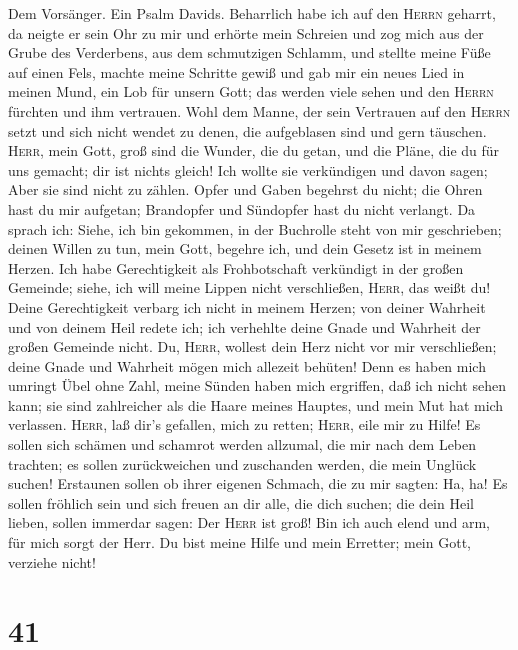  Dem Vorsänger. Ein Psalm Davids. Beharrlich habe ich auf
den \textsc{Herrn} geharrt, da neigte er sein Ohr zu mir und erhörte
mein Schreien  und zog mich aus der Grube des Verderbens,
aus dem schmutzigen Schlamm, und stellte meine Füße auf einen Fels,
machte meine Schritte gewiß  und gab mir ein neues Lied in
meinen Mund, ein Lob für unsern Gott; das werden viele sehen und den
\textsc{Herrn} fürchten und ihm vertrauen.  Wohl dem
Manne, der sein Vertrauen auf den \textsc{Herrn} setzt und sich nicht
wendet zu denen, die aufgeblasen sind und gern täuschen. 
\textsc{Herr}, mein Gott, groß sind die Wunder, die du getan, und die
Pläne, die du für uns gemacht; dir ist nichts gleich! Ich wollte sie
verkündigen und davon sagen; Aber sie sind nicht zu zählen.
 Opfer und Gaben begehrst du nicht; die Ohren hast du mir
aufgetan; Brandopfer und Sündopfer hast du nicht verlangt.
 Da sprach ich: Siehe, ich bin gekommen, in der Buchrolle
steht von mir geschrieben;  deinen Willen zu tun, mein
Gott, begehre ich, und dein Gesetz ist in meinem Herzen. 
Ich habe Gerechtigkeit als Frohbotschaft verkündigt in der großen
Gemeinde; siehe, ich will meine Lippen nicht verschließen,
\textsc{Herr}, das weißt du!  Deine Gerechtigkeit verbarg
ich nicht in meinem Herzen; von deiner Wahrheit und von deinem Heil
redete ich; ich verhehlte deine Gnade und Wahrheit der großen Gemeinde
nicht.  Du, \textsc{Herr}, wollest dein Herz nicht vor
mir verschließen; deine Gnade und Wahrheit mögen mich allezeit behüten!
 Denn es haben mich umringt Übel ohne Zahl, meine Sünden
haben mich ergriffen, daß ich nicht sehen kann; sie sind zahlreicher als
die Haare meines Hauptes, und mein Mut hat mich verlassen.
 \textsc{Herr}, laß dir's gefallen, mich zu retten;
\textsc{Herr}, eile mir zu Hilfe!  Es sollen sich schämen
und schamrot werden allzumal, die mir nach dem Leben trachten; es sollen
zurückweichen und zuschanden werden, die mein Unglück suchen!
 Erstaunen sollen ob ihrer eigenen Schmach, die zu mir
sagten: Ha, ha!  Es sollen fröhlich sein und sich freuen
an dir alle, die dich suchen; die dein Heil lieben, sollen immerdar
sagen: Der \textsc{Herr} ist groß!  Bin ich auch elend
und arm, für mich sorgt der Herr. Du bist meine Hilfe und mein Erretter;
mein Gott, verziehe nicht!

\hypertarget{section-40}{%
\section{41}\label{section-40}}


